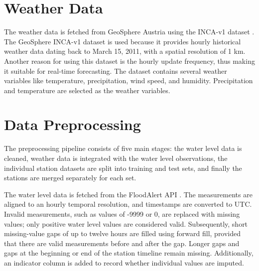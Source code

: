 \section{Weather Data}
The weather data is fetched from GeoSphere Austria using the \ac{INCA}-v1 dataset \cite{geosphereaustriaINCAv11Meteorologische2021}. The GeoSphere \ac{INCA}-v1 dataset \cite{geosphereaustriaINCAv11Meteorologische2021} is used because it provides hourly historical weather data dating back to March 15, 2011, with a spatial resolution of 1 km. Another reason for using this dataset is the hourly update frequency, thus making it suitable for real-time forecasting. The dataset contains several weather variables like temperature, precipitation, wind speed, and humidity. Precipitation and temperature are selected as the weather variables.



%   



\section{Data Preprocessing}
\label{sec:data-preprocessing}
The preprocessing pipeline consists of five main stages: the water level data is cleaned, weather data is integrated with the water level observations, the individual station datasets are split into training and test sets, and finally the stations are merged separately for each set.

The water level data is fetched from the FloodAlert API \cite{SOBOSGmbHPublic_waterlevel_api_doc2026}. The measurements are aligned to an hourly temporal resolution, and timestamps are converted to UTC. Invalid measurements, such as values of -9999 or 0, are replaced with missing values; only positive water level values are considered valid. Subsequently, short missing-value gaps of up to twelve hours are filled using forward fill, provided that there are valid measurements before and after the gap. Longer gaps and gaps at the beginning or end of the station timeline remain missing. Additionally, an indicator column is added to record whether individual values are imputed.

